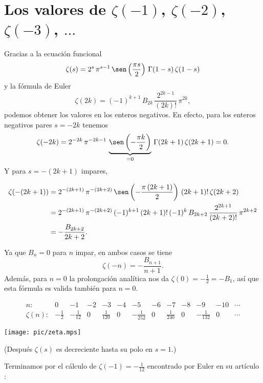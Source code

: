 \documentclass{article}
\numberwithin{equation}{section}
\theoremstyle{definition}
\begin{document}
\section{Los valores de $\zeta (-1)$, $\zeta (-2)$, $\zeta (-3)$, $\ldots$}

Gracias a la ecuación funcional
$$\zeta (s) = 2^s \, \pi^{s-1} \, \sen \left(\frac{\pi s}{2}\right)\,\Gamma (1-s)\,\zeta (1-s)$$
y la fórmula de Euler
$$\zeta (2k) = (-1)^{k+1} \, B_{2k}\,\frac{2^{2k-1}}{(2k)!}\,\pi^{2k},$$
podemos obtener los valores en los enteros negativos. En efecto, para los
enteros negativos pares $s = -2k$ tenemos
$$\zeta (-2k) = 2^{-2k} \, \pi^{-2k-1} \, \underbrace{\sen \left(-\frac{\pi k}{2}\right)}_{= 0}\,\Gamma (2k+1)\,\zeta (2k+1) = 0.$$
Y para $s = -(2k+1)$ impares,

\begin{align*}
  \zeta (-(2k+1)) & = 2^{-(2k+1)} \, \pi^{-(2k+2)} \, \sen \left(-\frac{\pi\,(2k+1)}{2}\right)\,(2k+1)!\,\zeta (2k+2) \\
                  & = 2^{-(2k+1)} \, \pi^{-(2k+2)}\,(-1)^{k+1}\,(2k+1)!\,(-1)^k \, B_{2k+2}\,\frac{2^{2k+1}}{(2k+2)!}\,\pi^{2k+2} \\
                  & = -\frac{B_{2k+2}}{2k+2}.
\end{align*}

Ya que $B_n = 0$ para $n$ impar, en ambos casos se tiene
$$\zeta (-n) = -\frac{B_{n+1}}{n+1}.$$
Además, para $n = 0$ la prolongación analítica nos da
$\zeta (0) = -\frac{1}{2} = -B_1$, así que esta fórmula es valida también para
$n = 0$.

\[ \begin{array}{rcccccccccccc}
     n\colon & 0 & -1 & -2 & -3 & -4 & -5 & -6 & -7 & -8 & -9 & -10 & \cdots \\
     \hline
     \zeta(n)\colon & -\frac{1}{2} & -\frac{1}{12} & 0 & \frac{1}{120} & 0 & -\frac{1}{252} & 0 & \frac{1}{240} & 0 & -\frac{1}{132} & 0 & \cdots
   \end{array} \]

\begin{center}
  \noindent\texttt{[image: pic/zeta.mps]}
\end{center}

\noindent (Después $\zeta (s)$ es decreciente hasta su polo en $s = 1$.)

\vspace{1em}

Terminamos por el cálculo de $\zeta (-1) = -\frac{1}{12}$ encontrado por Euler
en su artículo \cite{E247}:
\end{document}
